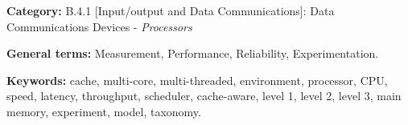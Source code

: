 \begin{abstracts}
\pagebreak

\textbf{Category:} B.4.1 [Input/output and Data Communications]: Data Communications Devices - \textit{Processors}

\textbf{General terms:} Measurement, Performance, Reliability, Experimentation.

\textbf{Keywords:} cache, multi-core, multi-threaded, environment, processor, CPU, speed, latency, throughput, scheduler, cache-aware, level 1, level 2, level 3, main memory, experiment, model, taxonomy.

\end{abstracts}


